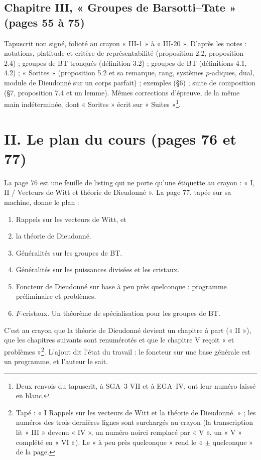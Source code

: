 \documentclass[11pt,a4paper]{article}
\begin{document}
\subsection*{Chapitre III, « Groupes de Barsotti–Tate » (pages 55 à 75)}

Tapuscrit non signé, folioté au crayon « III-1 » à « III-20 ». D'après les
notes : notations, platitude et critère de représentabilité (proposition
2.2, proposition 2.4) ; groupes de BT tronqués (définition 3.2) ; groupes
de BT (définitions 4.1, 4.2) ; « Sorites » (proposition 5.2 et sa
remarque, rang, systèmes $p$-adiques, dual, module de Dieudonné sur un
corps parfait) ; exemples (§6) ; suite de composition (§7, proposition 7.4
et un lemme). Mêmes corrections d'épreuve, de la même main indéterminée,
dont « Sorites » écrit sur « Suites »\footnote{Deux renvois du tapuscrit,
à SGA~3 VII et à EGA~IV, ont leur numéro laissé en blanc.}.

\section*{II. Le plan du cours (pages 76 et 77)}

La page 76 est une feuille de listing qui ne porte qu'une étiquette au
crayon : « I, II / Vecteurs de Witt et théorie de Dieudonné ». La page 77,
tapée sur sa machine, donne le plan :

\begin{enumerate}
  \item[I] Rappels sur les vecteurs de Witt, et
  \item[II] la théorie de Dieudonné.
  \item[III] Généralités sur les groupes de BT.
  \item[IV] Généralités sur les puissances divisées et les cristaux.
  \item[V] Foncteur de Dieudonné sur base à peu près quelconque :
  programme préliminaire et problèmes.
  \item[VI] $F$-cristaux. Un théorème de spécialisation pour les groupes
  de BT.
\end{enumerate}

C'est au crayon que la théorie de Dieudonné devient un chapitre à part
(« II »), que les chapitres suivants sont renumérotés et que le chapitre
V reçoit « et problèmes »\footnote{Tapé : « I Rappels sur les vecteurs de
Witt et la théorie de Dieudonné. » ; les numéros des trois dernières
lignes sont surchargés au crayon (la transcription lit « III » devenu
« IV », un numéro noirci remplacé par « V », un « V » complété en
« VI »). Le « à peu près quelconque » rend le « $\pm$ quelconque » de la
page.}. L'ajout dit l'état du travail : le
foncteur sur une base générale est un programme, et l'auteur le sait.
\end{document}
